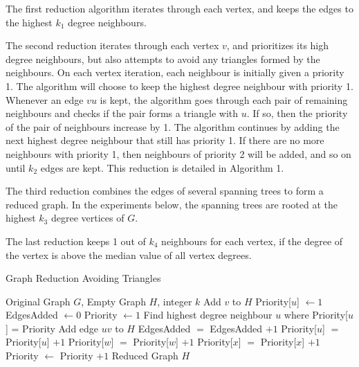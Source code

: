\documentclass[11pt]{article}
\begin{document}
The first reduction algorithm iterates through each vertex, and keeps the edges to the highest $k_1$ degree neighbours.

The second reduction iterates through each vertex $v$, and prioritizes its high degree neighbours, but also attempts to avoid any triangles formed by the neighbours.  On each vertex iteration, each neighbour is initially given a priority 1.  The algorithm will choose to keep the highest degree neighbour with priority 1.  Whenever an edge $vu$ is kept, the algorithm goes through each pair of remaining neighbours and checks if the pair forms a triangle with $u$.  If so, then the priority of the pair of neighbours increase by 1.  The algorithm continues by adding the next highest degree neighbour that still has priority 1.  If there are no more neighbours with priority 1, then neighbours of priority 2 will be added, and so on until $k_2$ edges are kept.  This reduction is detailed in Algorithm 1.

The third reduction combines the edges of several spanning trees to form a reduced graph.  In the experiments below, the spanning trees are rooted at the highest $k_3$ degree vertices of $G$.

The last reduction keeps 1 out of $k_4$ neighbours for each vertex, if the degree of the vertex is above the median value of all vertex degrees.

\begin{algorithm}
\caption{Graph Reduction Avoiding Triangles}
\begin{algorithmic}[1]
	\REQUIRE Original Graph $G$, Empty Graph $H$, integer $k$
		\STATE Add $v$ to $H$
			\STATE Priority[$u$] $\leftarrow 1$
		\ENDFOR
		\STATE EdgesAdded $\leftarrow 0$
		\STATE Priority $\leftarrow 1$
			\STATE Find highest degree neighbour $u$ where Priority[$u$] = Priority
			\STATE Add edge $uv$ to $H$
			\STATE EdgesAdded $=$ EdgesAdded $+1$
					\STATE Priority[$u$] $=$ Priority[$u$] $+1$
					\STATE Priority[$w$] $=$ Priority[$w$] $+1$
					\STATE Priority[$x$] $=$ Priority[$x$] $+1$
				\ENDIF
			\ENDFOR
			\STATE Priority $\leftarrow$ Priority $+ 1$
		\ENDWHILE
	\ENDFOR
	\ENSURE Reduced Graph $H$
\end{algorithmic}
\end{algorithm}

\pagebreak
\end{document}
